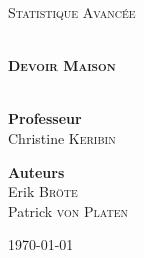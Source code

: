 \begin{titlepage}
\begin{center}


\hfill

\vfill 

\textsc{\Large Statistique Avancée}\\[0.5cm]

\vfill

\HRule \\[0.4cm]
{ \LARGE \bfseries \textsc{Devoir Maison}\\[0.4cm] }
\HRule \\[1.5cm]


\vfill

{\large
\begin{center}
  \textbf{Professeur}\\[0.1cm]
  Christine \textsc{Keribin}
\end{center}
\vfill
\begin{center}
  \textbf{Auteurs}\\[0.1cm]
  Erik \textsc{Bröte}\\[0.1cm]
  Patrick \textsc{von Platen}
\end{center}
}

\vfill

{\large \today}

\end{center}
\end{titlepage}